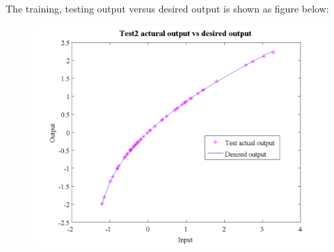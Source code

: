 \documentclass[epsfig]{article}
\begin{document}
The training, testing output versus desired output is shown as figure below:

\begin{figure}[H] 
\centering\includegraphics[width=4.5in]{output_test2.png} 
\end{figure} 
\end{document}
